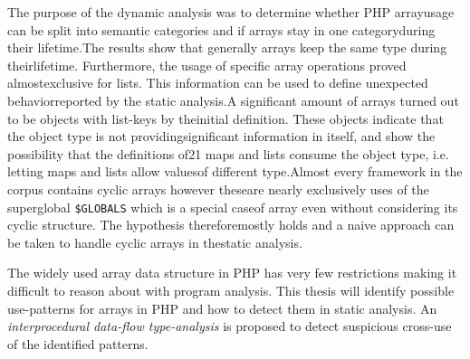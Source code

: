 
The purpose of the dynamic analysis was to determine whether PHP arrayusage can be split into semantic categories and if arrays stay in one categoryduring their lifetime.The results show that generally arrays keep the same type during theirlifetime.  Furthermore, the usage of specific array operations proved almostexclusive for lists. This information can be used to define unexpected behaviorreported by the static analysis.A significant amount of arrays turned out to be objects with list-keys by theinitial definition. These objects indicate that the object type is not providingsignificant information in itself, and show the possibility that the definitions of21
 maps and lists consume the object type, i.e. letting maps and lists allow valuesof different type.Almost every framework in the corpus contains cyclic arrays however theseare nearly exclusively uses of the superglobal \texttt{\$GLOBALS} which is a special caseof array even without considering its cyclic structure. The hypothesis thereforemostly holds and a naive approach can be taken to handle cyclic arrays in thestatic analysis.
 
 
 
The widely used array data structure in PHP has very few restrictions making it difficult to reason about with program analysis. This thesis will identify possible use-patterns for arrays in PHP and how to detect them in static analysis. An \emph{interprocedural data-flow type-analysis} is proposed to detect suspicious cross-use of the identified patterns.
